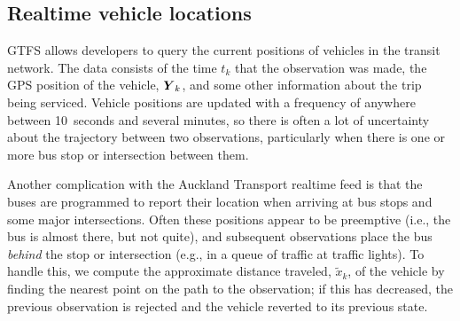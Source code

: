\subsection{Realtime vehicle locations}
\label{sec:realtime_data}

GTFS \rt allows developers to query the current positions of vehicles
in the transit network.
The data consists of the time $t_k$ that the observation was made,
the GPS position of the vehicle, $\mbox{$\boldsymbol{Y}$}_k$, 
and some other information about the trip being serviced.
Vehicle positions are updated with a frequency of anywhere between 10~seconds and several minutes,
so there is often a lot of uncertainty about the trajectory
between two observations, particularly when there is one or more bus stop
or intersection between them.

Another complication with the Auckland Transport realtime feed is that
the buses are programmed to report their location when arriving at
bus stops and some major intersections.
Often these positions appear to be preemptive 
(i.e., the bus is almost there, but not quite),
and subsequent observations place the bus \emph{behind} the stop or intersection
(e.g., in a queue of traffic at traffic lights).
To handle this, we compute the approximate distance traveled, $\tilde x_k$,
of the vehicle by finding the nearest point on the path to the observation;
if this has decreased, the previous observation is rejected and the vehicle reverted
to its previous state.

